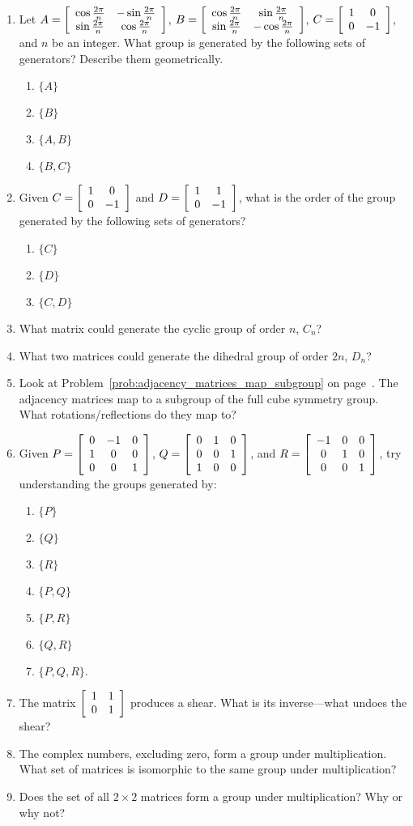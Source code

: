 \documentclass[../gatm.tex]{subfiles}
\begin{document}
\begin{enumerate}
\item Let $A=\left[\begin{array}{cc} \cos\frac{2\pi}{n} & -\sin\frac{2\pi}{n} \\ \sin\frac{2\pi}{n} & \cos\frac{2\pi}{n} \end{array}\right]$, $B=\left[\begin{array}{cc} \cos\frac{2\pi}{n} & \sin\frac{2\pi}{n} \\ \sin\frac{2\pi}{n} & -\cos\frac{2\pi}{n} \end{array}\right]$, $C=\left[\begin{array}{cc} 1 & 0 \\ 0 & -1 \end{array}\right]$, and $n$ be an integer. What group is generated by the following sets of generators? Describe them geometrically. \begin{multicols}{4}%
\begin{enumerate}%
\item $\{A\}$
\item $\{B\}$
\item $\{A,B\}$
\item $\{B,C\}$
\end{enumerate}%
\end{multicols}%
\item Given $C=\left[\begin{array}{cc} 1 & 0 \\ 0 & -1 \end{array}\right]$ and $D=\left[\begin{array}{cc} 1 & 1 \\ 0 & -1 \end{array}\right]$, what is the order of the group generated by the following sets of generators?
\begin{multicols}{3}
\begin{enumerate}
\item $\{C\}$
\item $\{D\}$
\item $\{C,D\}$
\end{enumerate}
\end{multicols}
\item What matrix could generate the cyclic group of order $n$, $C_n$?
\item What two matrices could generate the dihedral group of order $2n$, $D_n$?
\item Look at Problem~\ref{prob:adjacency_matrices_map_subgroup} on page~\pageref{prob:adjacency_matrices_map_subgroup}. The adjacency matrices map to a subgroup of the full cube symmetry group. What rotations/reflections do they map to?
\item Given $P=\left[\begin{array}{ccc} 0 & -1 & 0 \\ 1 & 0 & 0 \\ 0 & 0 & 1 \end{array}\right]$, $Q=\left[\begin{array}{ccc} 0 & 1 & 0 \\ 0 & 0 & 1 \\ 1 & 0 & 0 \end{array}\right]$, and $R=\left[\begin{array}{ccc} -1 & 0 & 0 \\ 0 & 1 & 0 \\ 0 & 0 & 1 \end{array}\right]$, try understanding the groups generated by:
\begin{multicols}{4}
\begin{enumerate}
\item $\{P\}$
\item $\{Q\}$
\item $\{R\}$
\item $\{P,Q\}$
\item $\{P,R\}$
\item $\{Q,R\}$
\item $\{P,Q,R\}.$
\end{enumerate}
\end{multicols}
\item The matrix $\left[\begin{array}{cc} 1 & 1 \\ 0 & 1 \end{array}\right]$ produces a shear. What is its inverse---what undoes the shear?
\item The complex numbers, excluding zero, form a group under multiplication. What set of matrices is isomorphic to the same group under multiplication?
\item Does the set of all $2\times 2$ matrices form a group under multiplication? Why or why not?
\end{enumerate}
\end{document}
